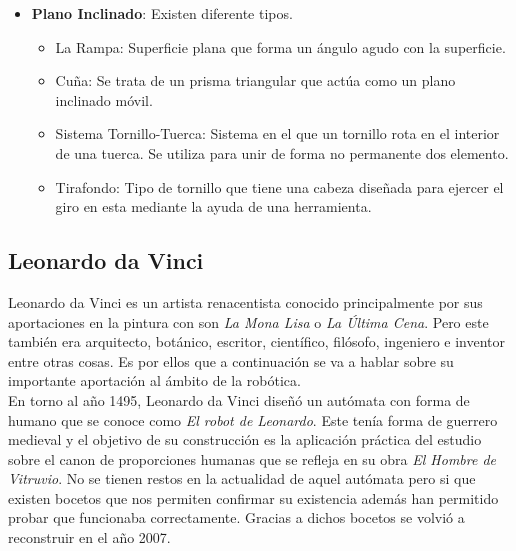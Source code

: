 \begin{itemize}
\begin{itemize}
\end{itemize}

\item \textbf{Plano Inclinado}: Existen diferente tipos.

\begin{itemize}
\item La Rampa: Superficie plana que forma un ángulo agudo con la superficie.

\item Cuña: Se trata de un prisma triangular que actúa como un plano inclinado móvil.

\item Sistema Tornillo-Tuerca: Sistema en el que un tornillo rota en el interior de una tuerca. Se utiliza para unir de forma no permanente dos elemento.

\item Tirafondo: Tipo de tornillo que tiene una cabeza diseñada para ejercer el giro en esta mediante la ayuda de una herramienta.

\end{itemize}

\end{itemize}

\subsection{Leonardo da Vinci}


Leonardo da Vinci es un artista renacentista conocido principalmente por sus aportaciones en la pintura con son \textit{La Mona Lisa} o \textit{La Última Cena}. Pero este también era arquitecto, botánico, escritor, científico, filósofo, ingeniero e inventor entre otras cosas. Es por ellos que a continuación se va a hablar sobre su importante aportación al ámbito de la robótica.\\

En torno al año 1495, Leonardo da Vinci diseñó un autómata con forma de humano que se conoce como \textit{El robot de Leonardo}. Este tenía forma de guerrero medieval y el objetivo de su construcción es la aplicación práctica del estudio sobre el canon de proporciones humanas que se refleja en su obra \textit{El Hombre de Vitruvio}. No se tienen restos en la actualidad de aquel autómata pero si que existen bocetos que nos permiten confirmar su existencia además han permitido probar que funcionaba correctamente. Gracias a dichos bocetos se volvió a reconstruir en el año 2007.\\

